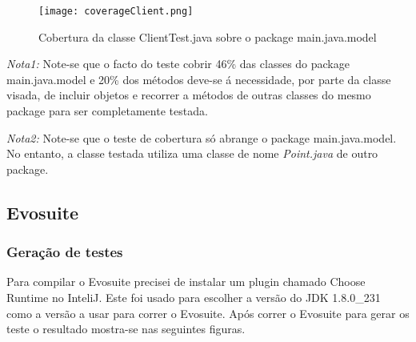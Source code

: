 \begin{figure}[H]

  \centering

  \texttt{[image: coverageClient.png]}

  \caption {Cobertura da classe ClientTest.java sobre o package main.java.model}

  \label {fig31}

\end{figure}

\par \textit{Nota1:} Note-se que o facto do teste cobrir 46\% das classes do package main.java.model e 20\% dos métodos deve-se á necessidade, por parte da classe visada, de incluir objetos e recorrer a métodos de outras classes do mesmo package para ser completamente testada.\newline
\par \textit{Nota2:} Note-se que o teste de cobertura só abrange o package main.java.model. No entanto, a classe testada utiliza uma classe de nome \textit{Point.java} de outro package.

\subsection{Evosuite}

\subsubsection{Geração de testes}
\par Para compilar o Evosuite precisei de instalar um plugin chamado Choose Runtime no InteliJ. Este foi usado para escolher a versão do JDK 1.8.0\_231 como a versão a usar para correr o Evosuite. Após correr o Evosuite para gerar os teste o resultado mostra-se nas seguintes figuras.

